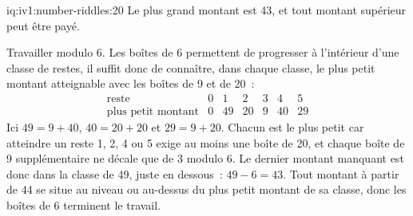 \begin{solution}{iq:iv1:number-riddles:20}
Le plus grand montant est 43, et tout montant supérieur peut être payé.

Travailler modulo 6. Les boîtes de 6 permettent de progresser à l'intérieur d'une classe de restes, il suffit donc de connaître, dans chaque classe, le plus petit montant atteignable avec les boîtes de 9 et de 20~:
\[
\begin{array}{c|cccccc}
\text{reste} & 0 & 1 & 2 & 3 & 4 & 5 \\ \hline
\text{plus petit montant} & 0 & 49 & 20 & 9 & 40 & 29
\end{array}
\]
Ici $49 = 9 + 40$, $40 = 20 + 20$ et $29 = 9 + 20$. Chacun est le plus petit car atteindre un reste 1, 2, 4 ou 5 exige au moins une boîte de 20, et chaque boîte de 9 supplémentaire ne décale que de 3 modulo 6. Le dernier montant manquant est donc dans la classe de 49, juste en dessous~: $49 - 6 = 43$. Tout montant à partir de 44 se situe au niveau ou au-dessus du plus petit montant de sa classe, donc les boîtes de 6 terminent le travail.

\end{solution}

